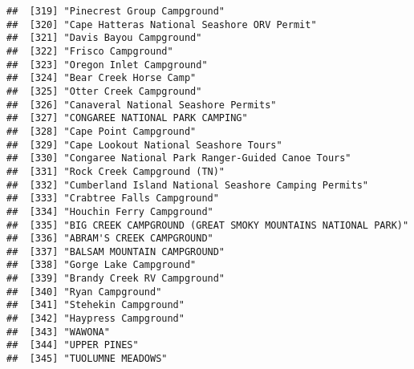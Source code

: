\documentclass[
]{article}
\begin{document}
\begin{verbatim}
##  [319] "Pinecrest Group Campground"                                                          
##  [320] "Cape Hatteras National Seashore ORV Permit"                                          
##  [321] "Davis Bayou Campground"                                                              
##  [322] "Frisco Campground"                                                                   
##  [323] "Oregon Inlet Campground"                                                             
##  [324] "Bear Creek Horse Camp"                                                               
##  [325] "Otter Creek Campground"                                                              
##  [326] "Canaveral National Seashore Permits"                                                 
##  [327] "CONGAREE NATIONAL PARK CAMPING"                                                      
##  [328] "Cape Point Campground"                                                               
##  [329] "Cape Lookout National Seashore Tours"                                                
##  [330] "Congaree National Park Ranger-Guided Canoe Tours"                                    
##  [331] "Rock Creek Campground (TN)"                                                          
##  [332] "Cumberland Island National Seashore Camping Permits"                                 
##  [333] "Crabtree Falls Campground"                                                           
##  [334] "Houchin Ferry Campground"                                                            
##  [335] "BIG CREEK CAMPGROUND (GREAT SMOKY MOUNTAINS NATIONAL PARK)"                          
##  [336] "ABRAM'S CREEK CAMPGROUND"                                                            
##  [337] "BALSAM MOUNTAIN CAMPGROUND"                                                          
##  [338] "Gorge Lake Campground"                                                               
##  [339] "Brandy Creek RV Campground"                                                          
##  [340] "Ryan Campground"                                                                     
##  [341] "Stehekin Campground"                                                                 
##  [342] "Haypress Campground"                                                                 
##  [343] "WAWONA"                                                                              
##  [344] "UPPER PINES"                                                                         
##  [345] "TUOLUMNE MEADOWS"                                                                    

\end{verbatim}
\end{document}

